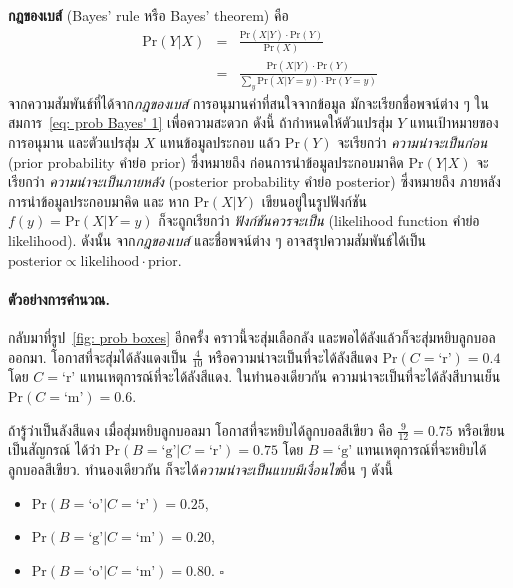 \textbf{กฎของเบส์} (Bayes' rule หรือ Bayes' theorem)
คือ
\begin{eqnarray}
\mathrm{Pr}(Y|X) &=& \frac{\mathrm{Pr}(X|Y) \cdot \mathrm{Pr}(Y)}{\mathrm{Pr}(X)}
\label{eq: prob Bayes' 1} \\
&=&
\frac{\mathrm{Pr}(X|Y) \cdot \mathrm{Pr}(Y)}{\sum_y \mathrm{Pr}(X|Y=y) \cdot \mathrm{Pr}(Y=y)}
\label{eq: prob Bayes' 2}
\end{eqnarray}
จากความสัมพันธ์ที่ได้จาก\textit{กฎของเบส์}
การอนุมานค่าที่สนใจจากข้อมูล
มักจะเรียกชื่อพจน์ต่าง ๆ
ในสมการ~\ref{eq: prob Bayes' 1} เพื่อความสะดวก ดังนี้
ถ้ากำหนดให้ตัวแปรสุ่ม $Y$ แทนเป้าหมายของการอนุมาน
และตัวแปรสุ่ม $X$ แทนข้อมูลประกอบ
แล้ว
$\mathrm{Pr}(Y)$ จะเรียกว่า \textit{ความน่าจะเป็นก่อน}
(prior probability คำย่อ prior)
ซึ่งหมายถึง ก่อนการนำข้อมูลประกอบมาคิด
$\mathrm{Pr}(Y|X)$ จะเรียกว่า
\textit{ความน่าจะเป็นภายหลัง}
(posterior probability คำย่อ posterior)
ซึ่งหมายถึง ภายหลังการนำข้อมูลประกอบมาคิด
และ
หาก $\mathrm{Pr}(X|Y)$ เขียนอยู่ในรูปฟังก์ชัน $f(y) = \mathrm{Pr}(X|Y=y)$
ก็จะถูกเรียกว่า \textit{ฟังก์ชันควรจะเป็น} (likelihood function คำย่อ likelihood).
ดังนั้น จาก\textit{กฎของเบส์}
และชื่อพจน์ต่าง ๆ อาจสรุปความสัมพันธ์ได้เป็น
$\mathrm{posterior} \propto \mathrm{likelihood} \cdot \mathrm{prior}$.

\paragraph{ตัวอย่างการคำนวณ.}
กลับมาที่รูป~\ref{fig: prob boxes}
อีกครั้ง คราวนี้จะสุ่มเลือกลัง และพอได้ลังแล้วก็จะสุ่มหยิบลูกบอลออกมา.
โอกาสที่จะสุ่มได้ลังแดงเป็น $\frac{4}{10}$ หรือความน่าจะเป็นที่จะได้ลังสีแดง $\mathrm{Pr}(C = \mbox{`r'}) = 0.4$
โดย $C = \mbox{`r'}$ แทนเหตุการณ์ที่จะได้ลังสีแดง.
ในทำนองเดียวกัน ความน่าจะเป็นที่จะได้ลังสีบานเย็น $\mathrm{Pr}(C = \mbox{`m'}) = 0.6$.

ถ้ารู้ว่าเป็นลังสีแดง เมื่อสุ่มหยิบลูกบอลมา โอกาสที่จะหยิบได้ลูกบอลสีเขียว คือ $\frac{9}{12} = 0.75$ 
หรือเขียนเป็นสัญกรณ์ ได้ว่า
$\mathrm{Pr}(B = \mbox{`g'}|C = \mbox{`r'}) = 0.75$
โดย $B = \mbox{`g'}$ แทนเหตุการณ์ที่จะหยิบได้ลูกบอลสีเขียว.
ทำนองเดียวกัน ก็จะได้\textit{ความน่าจะเป็นแบบมีเงื่อนไข}อื่น ๆ ดังนี้
\begin{itemize}
	\item $\mathrm{Pr}(B = \mbox{`o'}|C = \mbox{`r'}) = 0.25$,
	\item $\mathrm{Pr}(B = \mbox{`g'}|C = \mbox{`m'}) = 0.20$, 
	\item $\mathrm{Pr}(B = \mbox{`o'}|C = \mbox{`m'}) = 0.80$.
	\hfill $\square$	
\end{itemize}

